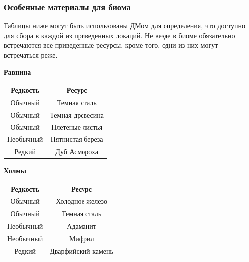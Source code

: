 \documentclass[a4paper, 9pt, twocolumn]{book}
\begin{document}
	\subsubsection{Особенные материалы для биома}
	
	Таблицы ниже могут быть использованы ДМом для определения, что доступно для сбора в каждой из приведенных локаций. Не везде в биоме обязательно встречаются все приведенные ресурсы, кроме того, одни из них могут встречаться реже. 
	
	
	
	\begin{table}[H]

		{\Large \textbf{Равнина}}
		
		\centering
		
		\medspace 
		
		\begin{tabularx}{\linewidth}{C C}
			
			\textbf{Редкость} & \textbf{Ресурс} \\
			
			Обычный & Темная сталь \\
			
			Обычный & Темная древесина \\
			
			Обычный & Плетеные листья \\
			
			Необычный & Пятнистая береза \\
			
			Редкий & Дуб Асмороха \\
			
		\end{tabularx}
	\end{table}

	\begin{table}[H]

		{\Large \textbf{Холмы}}
		
		\centering
		
		\medspace 
		
		\begin{tabularx}{\linewidth}{C C}
			
			\textbf{Редкость} & \textbf{Ресурс} \\
			
			Обычный & Холодное железо \\
			
			Обычный & Темная сталь \\
			
			Необычный & Адаманит \\
			
			Необычный & Мифрил \\
			
			Редкий & Дварфийский камень \\
			
		\end{tabularx}
	\end{table}
\end{document}

